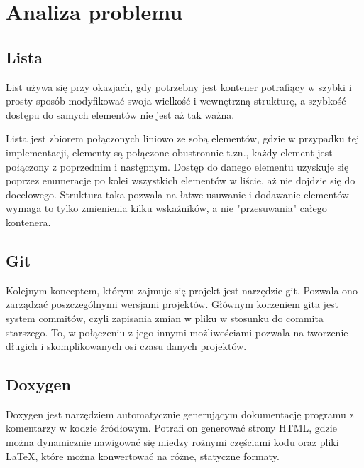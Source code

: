 \newpage
\section{Analiza problemu}		%

\subsection{Lista}

List używa się przy okazjach, gdy potrzebny jest kontener potrafiący w szybki i prosty sposób modyfikować swoja wielkość i wewnętrzną strukturę, a szybkość dostępu do samych elementów nie jest aż tak ważna.

Lista jest zbiorem połączonych liniowo ze sobą elementów, gdzie w przypadku tej implementacji, elementy są połączone obustronnie t.zn., każdy element jest połączony z poprzednim i następnym. Dostęp do danego elementu uzyskuje się poprzez enumeracje po kolei wszystkich elementów w liście, aż nie dojdzie się do docelowego. Struktura taka pozwala na łatwe usuwanie i dodawanie elementów - wymaga to tylko zmienienia kilku wskaźników, a nie "przesuwania" całego kontenera. 

\subsection{Git}
Kolejnym konceptem, którym zajmuje się projekt jest narzędzie git. Pozwala ono zarządzać poszczególnymi wersjami projektów. Głównym korzeniem gita jest system commitów, czyli zapisania zmian w pliku w stosunku do commita starszego. To, w połączeniu z jego innymi możliwościami pozwala na tworzenie długich i skomplikowanych osi czasu danych projektów. 

\subsection{Doxygen}
Doxygen jest narzędziem automatycznie generującym dokumentację programu z komentarzy w kodzie źródłowym. Potrafi on generować strony HTML, gdzie można dynamicznie nawigować się miedzy rożnymi częściami kodu oraz pliki \LaTeX, które można konwertować na różne, statyczne formaty.
